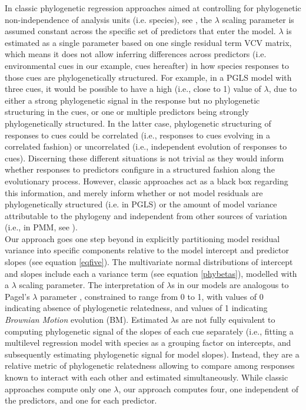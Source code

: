 \documentclass{article}\usepackage[]{graphicx}\usepackage[]{color}
\begin{document}
In classic phylogenetic regression approaches aimed at controlling for phylogenetic non-independence of analysis units (i.e. species), see \citep{revell2010phylogenetic}, the $\lambda$ scaling parameter is assumed constant across the specific set of predictors that enter the model. $\lambda$ is estimated as a single parameter based on one single residual term VCV matrix, which means it does not allow inferring differences across predictors (i.e. environmental cues in our example, cues hereafter) in how species responses to those cues are phylogenetically structured. For example, in a PGLS model with three cues, it would be possible to have a high (i.e., close to 1) value of $\lambda$, due to either a strong phylogenetic signal in the response but no phylogenetic structuring in the cues, or one or multiple predictors being strongly phylogenetically structured. In the latter case, phylogenetic structuring of responses to cues could be correlated (i.e., responses to cues evolving in a correlated fashion) or uncorrelated (i.e., independent evolution of responses to cues). Discerning these different situations is not trivial as they would inform whether responses to predictors configure in a structured fashion along the evolutionary process. However, classic approaches act as a black box regarding this information, and merely inform whether or not model residuals are phylogenetically structured (i.e. in PGLS) or the amount of model variance attributable to the phylogeny and independent from other sources of variation (i.e., in PMM, see \cite{housworth2004phylogenetic}).\\

Our approach goes one step beyond in explicitly partitioning model residual variance into specific components relative to the model intercept and predictor slopes (see equation \ref{eqfive}). The multivariate normal distributions of intercept and slopes include each a variance term (see equation \ref{phybetas}), modelled with a $\lambda$ scaling parameter. The interpretation of $\lambda$s in our models are analogous to Pagel's \cite{pagel1999inferring} $\lambda$ parameter \citep{housworth2004phylogenetic}, constrained to range from 0 to 1, with values of 0 indicating absence of phylogenetic relatedness, and values of 1 indicating \emph{Brownian Motion} evolution (BM). Estimated $\lambda$s are not fully equivalent to computing phylogenetic signal of the slopes of each cue separately (i.e., fitting a multilevel regression model with species as a grouping factor on intercepts, and subsequently estimating phylogenetic signal for model slopes). Instead, they are a relative metric of phylogenetic relatedness allowing to compare among responses known to interact with each other and estimated simultaneously. While classic approaches compute only one $\lambda$, our approach computes four, one independent of the predictors, and one for each predictor.\\ 
\end{document}
